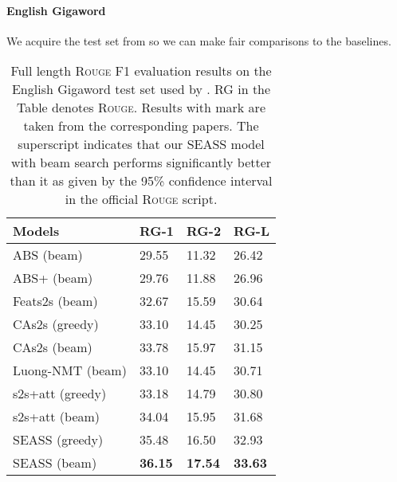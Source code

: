 \documentclass[11pt,a4paper]{article}
\newcommand{\ourModelName}{SEASS}
\begin{document}
\paragraph{English Gigaword}
We acquire the test set from \citet{rush-chopra-weston:2015:EMNLP} so we can make fair comparisons to the baselines.


\begin{table}[htbp]
	\begin{center}
		\begin{tabular}{llll}
			\toprule
			\bf Models & \bf RG-1 & \bf RG-2 & \bf RG-L \\ 
			\midrule
			ABS (beam)\otherpaper{} & 29.55\significant{} & 11.32\significant{}  & 26.42\significant{} \\
			ABS+ (beam)\otherpaper{} & 29.76\significant{} & 11.88\significant{} & 26.96\significant{} \\
			Feats2s (beam)\otherpaper{} & 32.67\significant{} & 15.59\significant{} & 30.64\significant{} \\
			CAs2s (greedy)\otherpaper{} & 33.10\significant{} & 14.45\significant{} & 30.25\significant{} \\
			CAs2s (beam)\otherpaper{} & 33.78\significant{} & 15.97\significant{} & 31.15\significant{} \\
			Luong-NMT (beam)\otherpaper{} & 33.10\significant{} & 14.45\significant{} & 30.71\significant{} \\
			s2s+att (greedy) & 33.18\significant{} & 14.79\significant{}  & 30.80\significant{} \\
			s2s+att (beam) & 34.04\significant{} & 15.95\significant{}  & 31.68\significant{} \\
			\hline
			\ourModelName{} (greedy) & 35.48  &  16.50  &  32.93 \\
			\ourModelName{} (beam) & \textbf{36.15} & \textbf{17.54} & \textbf{33.63} \\
			
			\bottomrule
		\end{tabular}
	\end{center}
	\caption{\label{gw_fb-table} Full length \textsc{Rouge} F1 evaluation results on the English Gigaword test set used by \citet{rush-chopra-weston:2015:EMNLP}. RG in the Table denotes \textsc{Rouge}. Results with \otherpaper{} mark are taken from the corresponding papers. The superscript \significant{}  indicates that our \ourModelName{} model with beam search performs significantly better than it as given by the 95\% confidence interval in the official \textsc{Rouge} script.}
\end{table}
\end{document}

